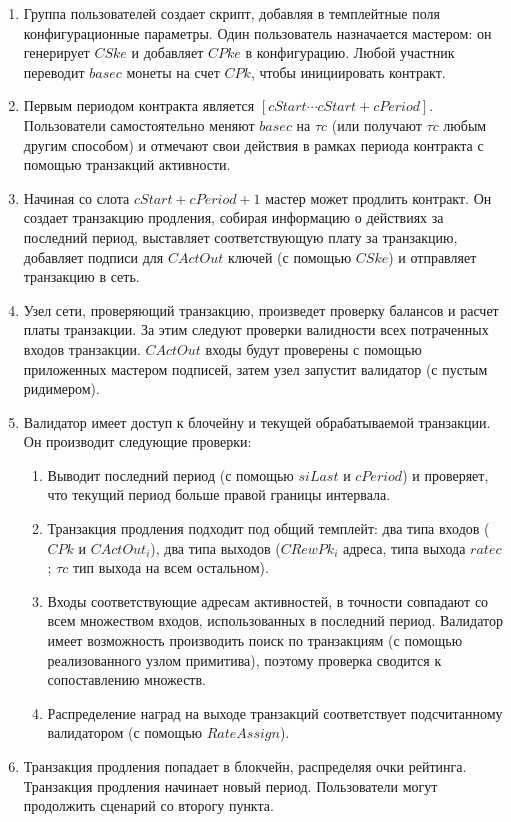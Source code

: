 \documentclass[]{itmo-student-thesis}
\begin{document}
\begin{enumerate}
\item Группа пользователей создает скрипт, добавляя в темплейтные поля
  конфигурационные параметры. Один пользователь назначается мастером:
  он генерирует $CSke$ и добавляет $CPke$ в конфигурацию. Любой
  участник переводит $basec$ монеты на счет $CPk$, чтобы инициировать
  контракт.
\item Первым периодом контракта является $[cStart \cdots
  cStart+cPeriod]$. Пользователи самостоятельно меняют $basec$ на
  $\tau c$ (или получают $\tau c$ любым другим способом) и отмечают
  свои действия в рамках периода контракта с помощью транзакций
  активности.
\item Начиная со слота $cStart + cPeriod + 1$ мастер может продлить
  контракт. Он создает транзакцию продления, собирая информацию о
  действиях за последний период, выставляет соответствующую плату за
  транзакцию, добавляет подписи для $CActOut$ ключей (с помощью
  $CSke$) и отправляет транзакцию в сеть.
\item Узел сети, проверяющий транзакцию, произведет проверку балансов
  и расчет платы транзакции. За этим следуют проверки валидности всех
  потраченных входов транзакции. $CActOut$ входы будут проверены с
  помощью приложенных мастером подписей, затем узел запустит валидатор
  (с пустым ридимером).
\item Валидатор имеет доступ к блочейну и текущей обрабатываемой
  транзакции. Он производит следующие проверки:
  \begin{enumerate}
  \item Выводит последний период (с помощью $siLast$ и $cPeriod$) и
    проверяет, что текущий период больше правой границы интервала.
  \item Транзакция продления подходит под общий темплейт: два типа
    входов ($CPk$ и $CActOut_i$), два типа выходов ($CRewPk_i$ адреса,
    типа выхода $ratec$; $\tau c$ тип выхода на всем остальном).
  \item Входы соответствующие адресам активностей, в точности
    совпадают со всем множеством входов, использованных в последний
    период. Валидатор имеет возможность производить поиск по
    транзакциям (с помощью реализованного узлом примитива), поэтому
    проверка сводится к сопоставлению множеств.
  \item Распределение наград на выходе транзакций соответствует
    подсчитанному валидатором (с помощью $RateAssign$).
  \end{enumerate}
\item Транзакция продления попадает в блокчейн, распределяя очки
  рейтинга. Транзакция продления начинает новый период. Пользователи
  могут продолжить сценарий со второгу пункта.
\end{enumerate}
\end{document}
